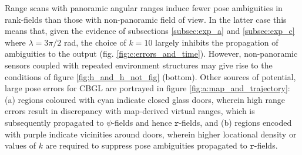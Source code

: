Range scans with panoramic angular ranges induce fewer pose ambiguities in
rank-fields than those with non-panoramic field of view. In the latter case
this means that, given the evidence of subsections \ref{subsec:exp_a} and
\ref{subsec:exp_c} where $\lambda = 3\pi/2$ rad, the choice of $k=10$ largely
inhibits the propagation of ambiguities to the output (fig.
\ref{fig:c:errors_and_time}).  However, non-panoramic sensors coupled
with repeated environment structures may give rise to the conditions of figure
\ref{fig:h_and_h_not_fig} (bottom). Other sources of potential, large pose
errors for CBGL are portrayed in figure \ref{fig:a:map_and_trajectory}: (a)
regions coloured with cyan indicate closed glass doors, wherein high range
errors result in discrepancy with map-derived virtual ranges, which is
subsequently propagated to $\psi$-fields and hence $\texttt{r}$-fields, and (b)
regions encoded with purple indicate vicinities around doors, wherein
higher locational density or values of $k$ are required to suppress pose
ambiguities propagated to $\texttt{r}$-fields.

